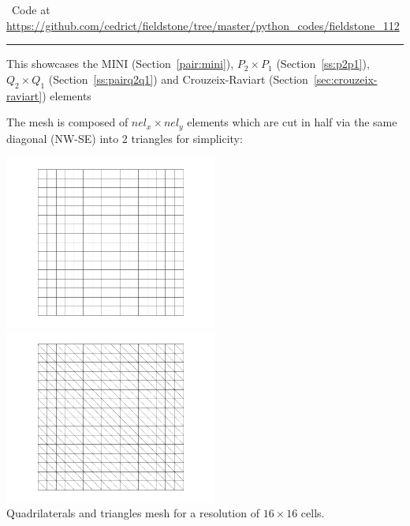 

\begin{center}
\inpython~Code at \url{https://github.com/cedrict/fieldstone/tree/master/python_codes/fieldstone_112}
\end{center}

\par\noindent\rule{\textwidth}{0.4pt}



This \stone showcases the MINI (Section~\ref{pair:mini}), 
$P_2\times P_1$ (Section~\ref{ss:p2p1}), $Q_2\times Q_1$ (Section~\ref{ss:pairq2q1}) 
and Crouzeix-Raviart  (Section~\ref{sec:crouzeix-raviart})
elements


The mesh is composed of $nel_x \times nel_y$ elements which are cut in half via the same diagonal (NW-SE) into 2 triangles
for simplicity: 

\begin{center}
\includegraphics[width=7cm]{python_codes/fieldstone_112/results/exp1/grid_quads}
\includegraphics[width=7cm]{python_codes/fieldstone_112/results/exp1/grid_triangles}\\
{\captionfont Quadrilaterals and triangles mesh for a resolution of $16\times 16$ cells.} 
\end{center}

